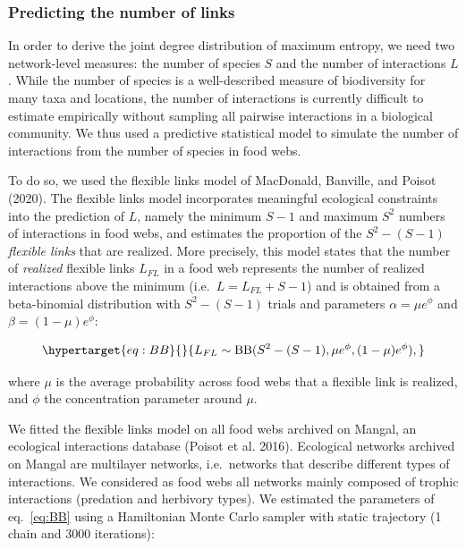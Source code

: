 \documentclass[11pt]{article}
\begin{document}
\hypertarget{predicting-the-number-of-links}{%
\subsubsection{Predicting the number of
links}\label{predicting-the-number-of-links}}

In order to derive the joint degree distribution of maximum entropy, we
need two network-level measures: the number of species \(S\) and the
number of interactions \(L\). While the number of species is a
well-described measure of biodiversity for many taxa and locations, the
number of interactions is currently difficult to estimate empirically
without sampling all pairwise interactions in a biological community. We
thus used a predictive statistical model to simulate the number of
interactions from the number of species in food webs.

To do so, we used the flexible links model of MacDonald, Banville, and
Poisot (2020). The flexible links model incorporates meaningful
ecological constraints into the prediction of \(L\), namely the minimum
\(S-1\) and maximum \(S^2\) numbers of interactions in food webs, and
estimates the proportion of the \(S^2 - (S - 1)\) \emph{flexible links}
that are realized. More precisely, this model states that the number of
\emph{realized} flexible links \(L_{FL}\) in a food web represents the
number of realized interactions above the minimum
(i.e.~\(L = L_{FL} + S - 1\)) and is obtained from a beta-binomial
distribution with \(S^2 - (S - 1)\) trials and parameters
\(\alpha = \mu e^\phi\) and \(\beta = (1 - \mu) e^\phi\):

\begin{equation}\protect\hypertarget{eq:BB}{}{L_{FL} \sim \mathrm{BB}(S^2 - (S - 1), \mu e^\phi, (1 - \mu) e^\phi),}\label{eq:BB}\end{equation}

where \(\mu\) is the average probability across food webs that a
flexible link is realized, and \(\phi\) the concentration parameter
around \(\mu\).

We fitted the flexible links model on all food webs archived on Mangal,
an ecological interactions database (Poisot et al. 2016). Ecological
networks archived on Mangal are multilayer networks, i.e.~networks that
describe different types of interactions. We considered as food webs all
networks mainly composed of trophic interactions (predation and
herbivory types). We estimated the parameters of eq.~\ref{eq:BB} using a
Hamiltonian Monte Carlo sampler with static trajectory (1 chain and 3000
iterations):
\end{document}
